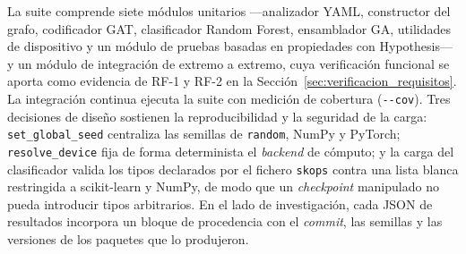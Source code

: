 La suite comprende siete módulos unitarios —analizador \acs{YAML}, constructor
del grafo, codificador \ac{GAT}, clasificador Random Forest, ensamblador \ac{GA},
utilidades de dispositivo y un módulo de pruebas basadas en propiedades con
Hypothesis— y un módulo de integración de extremo a extremo, cuya
verificación funcional se aporta como evidencia de RF-1 y RF-2 en la
Sección~\ref{sec:verificacion_requisitos}. La integración continua ejecuta la
suite con medición de cobertura (\texttt{-{}-cov}). Tres decisiones de diseño
sostienen la reproducibilidad y la seguridad de la carga: \texttt{set\_global\_seed}
centraliza las semillas de \texttt{random}, NumPy y PyTorch;
\texttt{resolve\_device} fija de forma determinista el \textit{backend} de
cómputo; y la carga del clasificador valida los tipos declarados por el fichero
\texttt{skops} contra una lista blanca restringida a scikit-learn y
NumPy, de modo que un \textit{checkpoint} manipulado no pueda introducir
tipos arbitrarios. En el lado de investigación, cada \acs{JSON} de resultados
incorpora un bloque de procedencia con el \textit{commit}, las semillas y las
versiones de los paquetes que lo produjeron.
